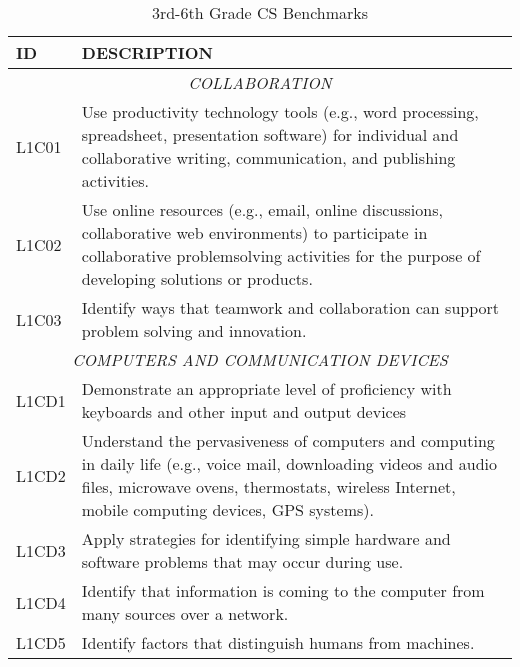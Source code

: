 \begin{longtable}{p{1.8cm}p{11cm}}
\caption{3rd-6th Grade CS Benchmarks} \\
\textbf{ID} & \textbf{DESCRIPTION} \\ \hline
\multicolumn{2}{c}{\textit{COLLABORATION}} \\
 L1C01   & Use productivity technology tools (e.g., word processing, spreadsheet, presentation software) for individual and collaborative writing, communication, and publishing activities.                                          \\
 L1C02   & Use online resources (e.g., email, online discussions, collaborative web environments) to participate in collaborative problemsolving activities for the purpose of developing solutions or products.                      \\
 L1C03   & Identify ways that teamwork and collaboration can support problem solving and innovation.                                                                                                                                  \\
 \multicolumn{2}{c}{\textit{COMPUTERS AND COMMUNICATION DEVICES}}                                                                                                                                                                                   \\
 L1CD1   & Demonstrate an appropriate level of proficiency with keyboards and other input and output devices                                                                                                                          \\
 L1CD2   & Understand the pervasiveness of computers and computing in daily life (e.g., voice mail, downloading videos and audio files, microwave ovens, thermostats, wireless Internet, mobile computing devices, GPS systems).      \\
 L1CD3   & Apply strategies for identifying simple hardware and software problems that may occur during use.                                                                                                                          \\
 L1CD4   & Identify that information is coming to the computer from many sources over a network.                                                                                                                                      \\
 L1CD5   & Identify factors that distinguish humans from machines.                                                                                                                                                                    \\

\end{longtable}
